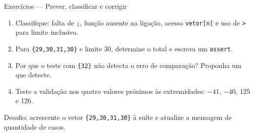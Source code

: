 \begin{frame}{Exercícios — Prever, classificar e corrigir}
\begin{enumerate}
\item Classifique: falta de \texttt{;}, função ausente na ligação, acesso \texttt{vetor[n]} e uso de \texttt{>} para limite inclusivo.
\item Para \texttt{\{29,30,31,30\}} e limite 30, determine o total e escreva um \texttt{assert}.
\item Por que o teste com \texttt{\{32\}} não detecta o erro de comparação? Proponha um que detecte.
\item Teste a validação nos quatro valores próximos às extremidades: $-41$, $-40$, 125 e 126.
\end{enumerate}
\small Desafio: acrescente o vetor \texttt{\{29,30,31,30\}} à suíte e atualize a mensagem de quantidade de casos.
\end{frame}
